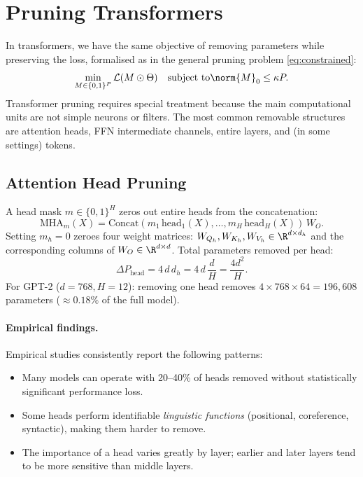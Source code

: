 \section{Pruning Transformers}

In transformers, we have the same objective of removing parameters while preserving the loss, formalised as in the general pruning problem \eqref{eq:constrained}:
\begin{equation}
	\min_{M \in \{0,1\}^P} \mathcal{L}(M \odot \Theta) \quad \text{subject to} \norm{M}_0 \le \kappa P.
	\label{eq:transformer_pruning}
\end{equation}
Transformer pruning requires special treatment because the main computational
units are not simple neurons or filters.  The most common removable structures
are attention heads, FFN intermediate channels, entire layers, and (in some
settings) tokens.

\subsection{Attention Head Pruning}

A head mask $m \in \{0,1\}^H$ zeros out entire heads from the concatenation:
\begin{equation}
	\mathrm{MHA}_m(X) = \mathrm{Concat}(m_1\,\mathrm{head}_1(X), \ldots,
	m_H\,\mathrm{head}_H(X))\,W_O.
	\label{eq:mha_masked}
\end{equation}
Setting $m_h = 0$ zeroes four weight matrices:
$W_{Q_h}, W_{K_h}, W_{V_h} \in \R^{d \times d_h}$ and the corresponding
columns of $W_O \in \R^{d \times d}$.  Total parameters removed per head:
\begin{equation}
	\Delta P_{\mathrm{head}} = 4\,d\,d_h = 4\,d\,\frac{d}{H} = \frac{4d^2}{H}.
	\label{eq:head_params}
\end{equation}
For GPT-2 ($d=768, H=12$): removing one head removes
$4 \times 768 \times 64 = 196{,}608$ parameters ($\approx 0.18\%$ of the
full model).

\paragraph{Empirical findings.} Empirical studies consistently report the
following patterns:
\begin{itemize}
	\item Many models can operate with 20--40\% of heads removed without
	statistically significant performance loss.
	\item Some heads perform identifiable \emph{linguistic functions}
	(positional, coreference, syntactic), making them harder to remove.
	\item The importance of a head varies greatly by layer; earlier and later
	layers tend to be more sensitive than middle layers.
\end{itemize}

